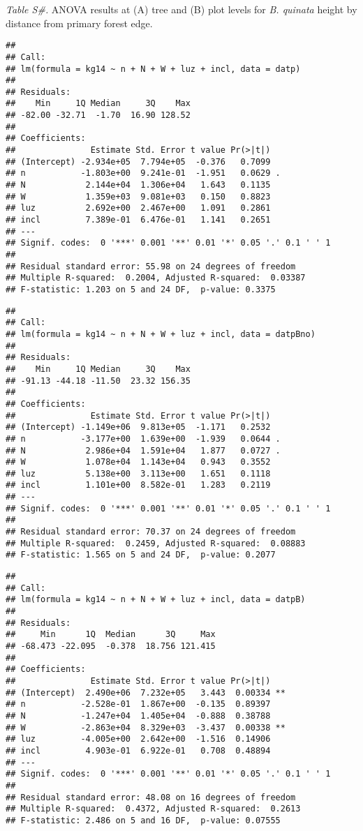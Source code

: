 \documentclass[]{article}
\begin{document}
\emph{Table S\#.} ANOVA results at (A) tree and (B) plot levels for
\emph{B. quinata} height by distance from primary forest edge.

\begin{verbatim}
## 
## Call:
## lm(formula = kg14 ~ n + N + W + luz + incl, data = datp)
## 
## Residuals:
##    Min     1Q Median     3Q    Max 
## -82.00 -32.71  -1.70  16.90 128.52 
## 
## Coefficients:
##               Estimate Std. Error t value Pr(>|t|)  
## (Intercept) -2.934e+05  7.794e+05  -0.376   0.7099  
## n           -1.803e+00  9.241e-01  -1.951   0.0629 .
## N            2.144e+04  1.306e+04   1.643   0.1135  
## W            1.359e+03  9.081e+03   0.150   0.8823  
## luz          2.692e+00  2.467e+00   1.091   0.2861  
## incl         7.389e-01  6.476e-01   1.141   0.2651  
## ---
## Signif. codes:  0 '***' 0.001 '**' 0.01 '*' 0.05 '.' 0.1 ' ' 1
## 
## Residual standard error: 55.98 on 24 degrees of freedom
## Multiple R-squared:  0.2004, Adjusted R-squared:  0.03387 
## F-statistic: 1.203 on 5 and 24 DF,  p-value: 0.3375
\end{verbatim}

\begin{verbatim}
## 
## Call:
## lm(formula = kg14 ~ n + N + W + luz + incl, data = datpBno)
## 
## Residuals:
##    Min     1Q Median     3Q    Max 
## -91.13 -44.18 -11.50  23.32 156.35 
## 
## Coefficients:
##               Estimate Std. Error t value Pr(>|t|)  
## (Intercept) -1.149e+06  9.813e+05  -1.171   0.2532  
## n           -3.177e+00  1.639e+00  -1.939   0.0644 .
## N            2.986e+04  1.591e+04   1.877   0.0727 .
## W            1.078e+04  1.143e+04   0.943   0.3552  
## luz          5.138e+00  3.113e+00   1.651   0.1118  
## incl         1.101e+00  8.582e-01   1.283   0.2119  
## ---
## Signif. codes:  0 '***' 0.001 '**' 0.01 '*' 0.05 '.' 0.1 ' ' 1
## 
## Residual standard error: 70.37 on 24 degrees of freedom
## Multiple R-squared:  0.2459, Adjusted R-squared:  0.08883 
## F-statistic: 1.565 on 5 and 24 DF,  p-value: 0.2077
\end{verbatim}

\begin{verbatim}
## 
## Call:
## lm(formula = kg14 ~ n + N + W + luz + incl, data = datpB)
## 
## Residuals:
##     Min      1Q  Median      3Q     Max 
## -68.473 -22.095  -0.378  18.756 121.415 
## 
## Coefficients:
##               Estimate Std. Error t value Pr(>|t|)   
## (Intercept)  2.490e+06  7.232e+05   3.443  0.00334 **
## n           -2.528e-01  1.867e+00  -0.135  0.89397   
## N           -1.247e+04  1.405e+04  -0.888  0.38788   
## W           -2.863e+04  8.329e+03  -3.437  0.00338 **
## luz         -4.005e+00  2.642e+00  -1.516  0.14906   
## incl         4.903e-01  6.922e-01   0.708  0.48894   
## ---
## Signif. codes:  0 '***' 0.001 '**' 0.01 '*' 0.05 '.' 0.1 ' ' 1
## 
## Residual standard error: 48.08 on 16 degrees of freedom
## Multiple R-squared:  0.4372, Adjusted R-squared:  0.2613 
## F-statistic: 2.486 on 5 and 16 DF,  p-value: 0.07555
\end{verbatim}
\end{document}

